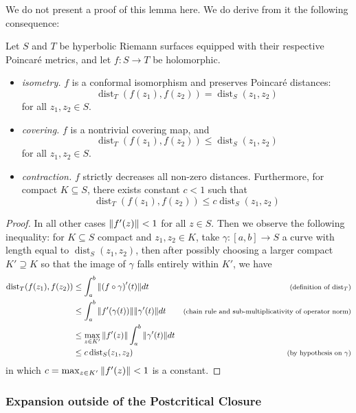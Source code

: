 \documentclass[../main.tex]{subfiles}
\newcommand\dist{\operatorname{dist}}
\newcommand\deriv[2]{{#1}'(#2)}
\begin{document}
We do not present a proof of this lemma here. We do derive from it the following consequence:

\begin{lem}
Let $S$ and $T$ be hyperbolic Riemann surfaces equipped with their respective Poincaré metrics, and let $f : S \to T$ be holomorphic. 
\begin{itemize}
    \item \emph{isometry.} $f$ is a conformal isomorphism and preserves Poincaré distances:
    \[
    \dist_T(f(z_1), f(z_2)) = \dist_S(z_1, z_2)
    \]
    for all $z_1, z_2 \in S$.
    \item \emph{covering.} $f$ is a nontrivial covering map, and
    \[
    \dist_T(f(z_1), f(z_2)) \le \dist_S(z_1, z_2)
    \]
    for all $z_1, z_2 \in S$.
    \item \emph{contraction.} $f$ strictly decreases all non-zero distances. Furthermore, for compact $K \subseteq S$, there exists constant $c < 1$ such that
    \[
    \dist_T(f(z_1), f(z_2)) \le c \dist_S(z_1, z_2)
    \]
\end{itemize}
\end{lem}
\begin{proof}

In all other cases $\norm{\deriv{f}{z}} < 1$ for all $z \in S$. Then we observe the following inequality: for $K \subseteq S$ compact and $z_1, z_2 \in K$, take $\gamma : [a, b] \to S$ a curve with length equal to $\dist_S(z_1, z_2)$, then after possibly choosing a larger compact $K' \supseteq K$ so that the image of $\gamma$ falls entirely within $K'$, we have
\begin{align*}
\dist_T(f(z_1), f(z_2))
&\le \int_a^b \norm{\deriv{(f \circ \gamma)}{t}} dt
&\by{definition of $\dist_T$}\\
&\le \int_a^b \norm{\deriv{f}{\gamma(t)}} \norm{\deriv{\gamma}{t}} dt
&\by{chain rule and sub-multiplicativity of operator norm}\\
&\le \max_{z \in K'} \norm{\deriv{f}{z}} \int_a^b \norm{\deriv{\gamma}{t}} dt &\\
&\le c \dist_S(z_1, z_2) &\by{by hypothesis on $\gamma$}
\end{align*}
in which $c = \max_{z \in K'} \norm{\deriv{f}{z}} < 1$ is a constant.
\end{proof}

\subsubsection{Expansion outside of the Postcritical Closure}
\end{document}
